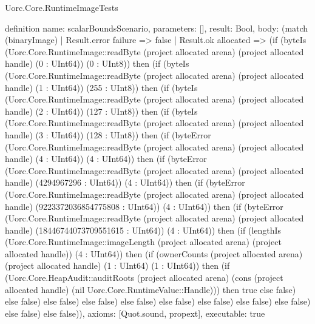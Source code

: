 \begin{lexlean}{Uorc.Core.RuntimeImageTests}
\begin{semanticmodule}
definition{
  name: scalarBoundsScenario,
  parameters: [],
  result: Bool,
  body: (match (binaryImage)
    | Result.error failure => false
    | Result.ok allocated => (if (byteIs (Uorc.Core.RuntimeImage::readByte (project allocated arena) (project allocated handle) (0 : UInt64)) (0 : UInt8)) then (if (byteIs (Uorc.Core.RuntimeImage::readByte (project allocated arena) (project allocated handle) (1 : UInt64)) (255 : UInt8)) then (if (byteIs (Uorc.Core.RuntimeImage::readByte (project allocated arena) (project allocated handle) (2 : UInt64)) (127 : UInt8)) then (if (byteIs (Uorc.Core.RuntimeImage::readByte (project allocated arena) (project allocated handle) (3 : UInt64)) (128 : UInt8)) then (if (byteError (Uorc.Core.RuntimeImage::readByte (project allocated arena) (project allocated handle) (4 : UInt64)) (4 : UInt64)) then (if (byteError (Uorc.Core.RuntimeImage::readByte (project allocated arena) (project allocated handle) (4294967296 : UInt64)) (4 : UInt64)) then (if (byteError (Uorc.Core.RuntimeImage::readByte (project allocated arena) (project allocated handle) (9223372036854775808 : UInt64)) (4 : UInt64)) then (if (byteError (Uorc.Core.RuntimeImage::readByte (project allocated arena) (project allocated handle) (18446744073709551615 : UInt64)) (4 : UInt64)) then (if (lengthIs (Uorc.Core.RuntimeImage::imageLength (project allocated arena) (project allocated handle)) (4 : UInt64)) then (if (ownerCounts (project allocated arena) (project allocated handle) (1 : UInt64) (1 : UInt64)) then (if (Uorc.Core.HeapAudit::auditRoots (project allocated arena) (cons (project allocated handle) (nil Uorc.Core.RuntimeValue::Handle))) then true else false) else false) else false) else false) else false) else false) else false) else false) else false) else false) else false)),
  axioms: [Quot.sound, propext],
  executable: true
}


\end{semanticmodule}
\end{lexlean}
